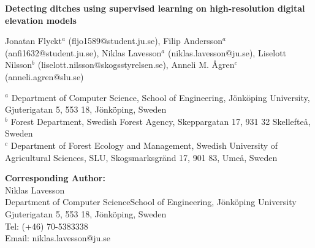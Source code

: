 \documentclass[11pt, review]{elsarticle} %
\begin{document}
\begin{frontmatter}


\begin{titlepage}
\begin{center}
\vspace*{1cm}

\textbf{ \large Detecting ditches using supervised learning on high-resolution digital elevation models}

\vspace{1.5cm}

Jonatan Flyckt$^{a}$ (fljo1589@student.ju.se), Filip Andersson$^{a}$ (anfi1632@student.ju.se), Niklas Lavesson$^a$ (niklas.lavesson@ju.se), Liselott Nilsson$^b$ (liselott.nilsson@skogsstyrelsen.se), Anneli M. \AA gren$^c$ (anneli.agren@slu.se) \\

\hspace{10pt}

\begin{flushleft}
\small  
$^a$ Department of Computer Science, School of Engineering, J\"onk\"oping University, Gjuterigatan 5, 553 18, J\"onk\"oping, Sweden \\
$^b$ Forest Department, Swedish Forest Agency, Skeppargatan 17, 931 32 Skellefte\aa, Sweden \\
$^c$ Department of Forest Ecology and Management, Swedish University of Agricultural Sciences, SLU, Skogsmarksgr\"and 17, 901 83, Ume\aa, Sweden

\vspace{1cm}
\textbf{Corresponding Author:} \\
Niklas Lavesson \\
Department of Computer Science\newline School of Engineering, J\"onk\"oping University \newline Gjuterigatan 5, 553 18, J\"onk\"oping, Sweden \\
Tel: (+46) 70-5383338 \\
Email: niklas.lavesson@ju.se

\end{flushleft}        
\end{center}
\end{titlepage}


\end{frontmatter}
\end{document}
